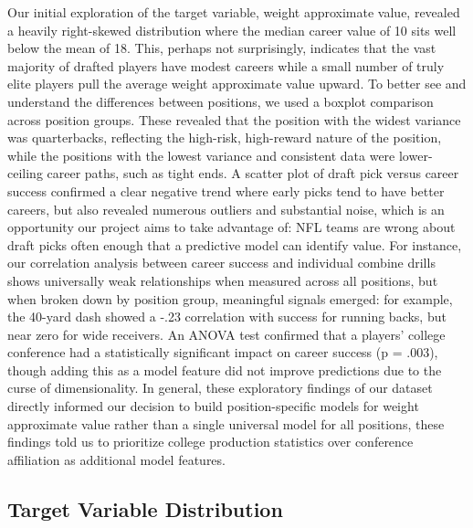 \documentclass[11pt]{article}
\begin{document}
Our initial exploration of the target variable, weight approximate value, revealed a heavily right-skewed distribution where the median career value of 10 sits well below the mean of 18. This, perhaps not surprisingly, indicates that the vast majority of drafted players have modest careers while a small number of truly elite players pull the average weight approximate value upward. To better see and understand the differences between positions, we used a boxplot comparison across position groups. These revealed that the position with the widest variance was quarterbacks, reflecting the high-risk, high-reward nature of the position, while the positions with the lowest variance and consistent data were lower-ceiling career paths, such as tight ends. A scatter plot of draft pick versus career success confirmed a clear negative trend where early picks tend to have better careers, but also revealed numerous outliers and substantial noise, which is an opportunity our project aims to take advantage of: NFL teams are wrong about draft picks often enough that a predictive model can identify value. For instance, our correlation analysis between career success and individual combine drills shows universally weak relationships when measured across all positions, but when broken down by position group, meaningful signals emerged: for example, the 40-yard dash showed a -.23 correlation with success for running backs, but near zero for wide receivers. An ANOVA test confirmed that a players' college conference had a statistically significant impact on career success (p = .003), though adding this as a model feature did not improve predictions due to the curse of dimensionality. In general, these exploratory findings of our dataset directly informed our decision to build position-specific models for weight approximate value rather than a single universal model for all positions, these findings told us to prioritize college production statistics over conference affiliation as additional model features. 


\subsection{Target Variable Distribution}

\end{document}

